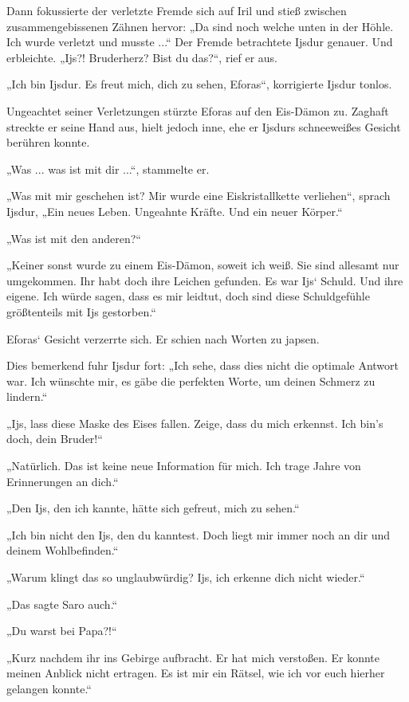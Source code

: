 Dann fokussierte der verletzte Fremde sich auf Iril und stieß zwischen zusammengebissenen Zähnen hervor: „Da sind noch welche unten in der Höhle. Ich wurde verletzt und musste ...“ Der Fremde betrachtete Ijsdur genauer. Und erbleichte. „Ijs?! Bruderherz? Bist du das?“, rief er aus.

„Ich bin Ijsdur. Es freut mich, dich zu sehen, Eforas“, korrigierte Ijsdur tonlos.

Ungeachtet seiner Verletzungen stürzte Eforas auf den Eis-Dämon zu. Zaghaft streckte er seine Hand aus, hielt jedoch inne, ehe er Ijsdurs schneeweißes Gesicht berühren konnte.

„Was ... was ist mit dir ...“, stammelte er.

„Was mit mir geschehen ist? Mir wurde eine Eiskristallkette verliehen“, sprach Ijsdur, „Ein neues Leben. Ungeahnte Kräfte. Und ein neuer Körper.“

„Was ist mit den anderen?“

„Keiner sonst wurde zu einem Eis-Dämon, soweit ich weiß. Sie sind allesamt nur umgekommen. Ihr habt doch ihre Leichen gefunden. Es war Ijs‘ Schuld. Und ihre eigene. Ich würde sagen, dass es mir leidtut, doch sind diese Schuldgefühle größtenteils mit Ijs gestorben.“

Eforas‘ Gesicht verzerrte sich. Er schien nach Worten zu japsen.

Dies bemerkend fuhr Ijsdur fort: „Ich sehe, dass dies nicht die optimale Antwort war. Ich wünschte mir, es gäbe die perfekten Worte, um deinen Schmerz zu lindern.“

„Ijs, lass diese Maske des Eises fallen. Zeige, dass du mich erkennst. Ich bin’s doch, dein Bruder!“

„Natürlich. Das ist keine neue Information für mich. Ich trage Jahre von Erinnerungen an dich.“

„Den Ijs, den ich kannte, hätte sich gefreut, mich zu sehen.“

„Ich bin nicht den Ijs, den du kanntest. Doch liegt mir immer noch an dir und deinem Wohlbefinden.“

„Warum klingt das so unglaubwürdig? Ijs, ich erkenne dich nicht wieder.“

„Das sagte Saro auch.“

„Du warst bei Papa?!“

„Kurz nachdem ihr ins Gebirge aufbracht. Er hat mich verstoßen. Er konnte meinen Anblick nicht ertragen. Es ist mir ein Rätsel, wie ich vor euch hierher gelangen konnte.“

